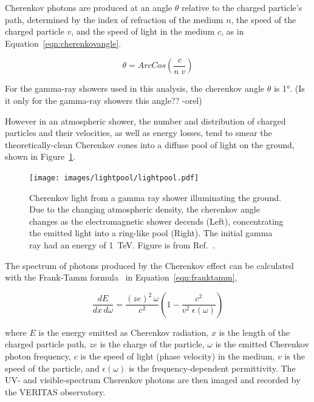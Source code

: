   Cherenkov photons are produced at an angle $\theta$ relative to the charged particle's path, determined by the index of refraction of the medium $n$, the speed of the charged particle $v$, and the speed of light in the medium $c$, as in Equation~\ref{eqn:cherenkovangle}.

  \begin{equation}\label{eqn:cherenkovangle}
    \theta = ArcCos \left ( \frac{c}{n \; v} \right )
  \end{equation}
  
  For the gamma-ray showers used in this analysis, the cherenkov angle $\theta$ is \nicetilde\ang{1}.
  {\color{red}(Is it only for the gamma-ray showers this angle?? -orel)}

  However in an atmospheric shower, the number and distribution of charged particles and their velocities, as well as energy losses, tend to smear the theoretically-clean Cherenkov cones into a diffuse pool of light on the ground, shown in Figure~\ref{fig:lightpool}.

  \begin{figure}[ht]
    \centering
    \texttt{[image: images/lightpool/lightpool.pdf]}
    \caption[Chernekov Light Pool]{
      Cherenkov light from a gamma ray shower illuminating the ground.
      Due to the changing atmospheric density, the cherenkov angle changes as the electromagnetic shower decends (Left), concentrating the emitted light into a ring-like pool (Right).
      The initial gamma ray had an energy of \SI{1}{\TeV}.
      Figure is from Ref.~\cite{Voelk}.
    }
    \label{fig:lightpool}
  \end{figure}
  
  The spectrum of photons produced by the Cherenkov effect can be calculated with the Frank-Tamm formula~\cite{franktamm1,franktamm2} in Equation~\ref{eqn:franktamm},
  
  \begin{equation}\label{eqn:franktamm}
    \frac{dE}{dx\,d\omega}=\frac{(ze)^2 \, \omega}{c^2} \left ( 1 - \frac{c^2}{v^2 \;\epsilon(\omega)} \right )
  \end{equation}
  
  where $E$ is the energy emitted as Cherenkov radiation, $x$ is the length of the charged particle path, $ze$ is the charge of the particle, $\omega$ is the emitted Cherenkov photon frequency, $c$ is the speed of light (phase velocity) in the medium, $v$ is the speed of the particle, and $\epsilon(\omega)$ is the frequency-dependent permittivity.
  The UV- and visible-spectrum Cherenkov photons are then imaged and recorded by the VERITAS observatory.
  
